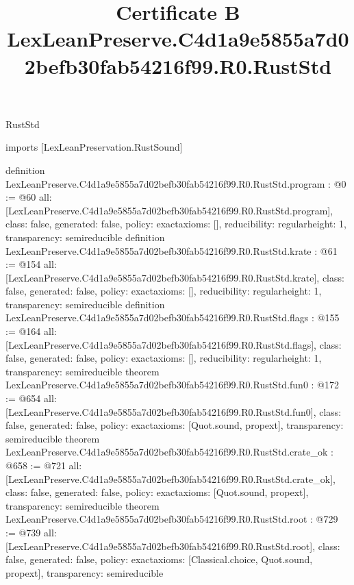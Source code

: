 \begin{lexlean}{RustStd}
\title{Certificate B LexLeanPreserve.C4d1a9e5855a7d02befb30fab54216f99.R0.RustStd}
\begin{coremodule}
imports [LexLeanPreservation.RustSound]

definition LexLeanPreserve.C4d1a9e5855a7d02befb30fab54216f99.R0.RustStd.program : @0 := @60 {
  all: [LexLeanPreserve.C4d1a9e5855a7d02befb30fab54216f99.R0.RustStd.program],
  class: false,
  generated: false,
  policy: exact{axioms: []},
  reducibility: regular{height: 1},
  transparency: semireducible
}
definition LexLeanPreserve.C4d1a9e5855a7d02befb30fab54216f99.R0.RustStd.krate : @61 := @154 {
  all: [LexLeanPreserve.C4d1a9e5855a7d02befb30fab54216f99.R0.RustStd.krate],
  class: false,
  generated: false,
  policy: exact{axioms: []},
  reducibility: regular{height: 1},
  transparency: semireducible
}
definition LexLeanPreserve.C4d1a9e5855a7d02befb30fab54216f99.R0.RustStd.flags : @155 := @164 {
  all: [LexLeanPreserve.C4d1a9e5855a7d02befb30fab54216f99.R0.RustStd.flags],
  class: false,
  generated: false,
  policy: exact{axioms: []},
  reducibility: regular{height: 1},
  transparency: semireducible
}
theorem LexLeanPreserve.C4d1a9e5855a7d02befb30fab54216f99.R0.RustStd.fun0 : @172 := @654 {
  all: [LexLeanPreserve.C4d1a9e5855a7d02befb30fab54216f99.R0.RustStd.fun0],
  class: false,
  generated: false,
  policy: exact{axioms: [Quot.sound, propext]},
  transparency: semireducible
}
theorem LexLeanPreserve.C4d1a9e5855a7d02befb30fab54216f99.R0.RustStd.crate_ok : @658 := @721 {
  all: [LexLeanPreserve.C4d1a9e5855a7d02befb30fab54216f99.R0.RustStd.crate_ok],
  class: false,
  generated: false,
  policy: exact{axioms: [Quot.sound, propext]},
  transparency: semireducible
}
theorem LexLeanPreserve.C4d1a9e5855a7d02befb30fab54216f99.R0.RustStd.root : @729 := @739 {
  all: [LexLeanPreserve.C4d1a9e5855a7d02befb30fab54216f99.R0.RustStd.root],
  class: false,
  generated: false,
  policy: exact{axioms: [Classical.choice, Quot.sound, propext]},
  transparency: semireducible
}


\end{coremodule}
\end{lexlean}
